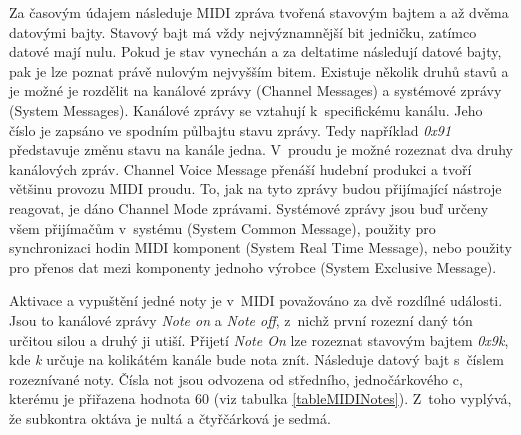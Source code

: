 Za časovým údajem následuje MIDI zpráva tvořená stavovým bajtem 
a až dvěma datovými bajty.
Stavový bajt má vždy nejvýznamnější bit jedničku,
zatímco datové mají nulu.
Pokud je stav vynechán a za deltatime následují datové bajty, 
pak je lze poznat právě nulovým nejvyšším bitem.
Existuje několik druhů stavů a je možné je rozdělit na 
kanálové zprávy (Channel Messages) 
a systémové zprávy (System Messages).
Kanálové zprávy se vztahují k~specifickému kanálu.
Jeho číslo je zapsáno ve spodním půlbajtu stavu zprávy.
Tedy například \emph{0x91} představuje změnu stavu na kanále jedna.
V~proudu je možné rozeznat dva druhy kanálových zpráv.
Channel Voice Message přenáší hudební produkci 
a tvoří většinu provozu MIDI proudu.
To, jak na tyto zprávy budou přijímající nástroje reagovat, 
je dáno Channel Mode zprávami.
Systémové zprávy jsou buď 
určeny všem přijímačům v~systému (System Common Message),
použity pro synchronizaci hodin MIDI komponent (System Real Time Message), 
nebo použity pro přenos dat mezi komponenty jednoho výrobce 
(System Exclusive Message). 
\cite{Back_SMF_Specif}
\par

Aktivace a vypuštění jedné noty je v~MIDI považováno za dvě rozdílné události.
Jsou to kanálové zprávy \emph{Note on} a \emph{Note off},
z~nichž první rozezní daný tón určitou silou a druhý ji utiší.
Přijetí \emph{Note On} lze rozeznat stavovým bajtem \emph{0x9k}, 
kde \emph{k} určuje na kolikátém kanále bude nota znít.
Následuje datový bajt s~číslem rozeznívané noty.
Čísla not jsou odvozena od středního, jednočárkového c, 
kterému je přiřazena hodnota 60 (viz tabulka \ref{tableMIDINotes}).
Z~toho vyplývá, že subkontra oktáva je nultá a čtyřčárková je sedmá.


